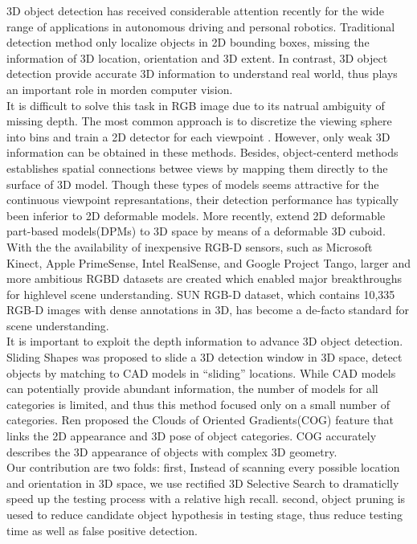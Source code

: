 \documentclass[english]{ccdconf}
\begin{document}
3D object detection has received considerable attention recently for the wide range of applications in autonomous driving and personal robotics\cite{xiang2014beyond}. Traditional detection method only localize objects in 2D bounding boxes, missing the information of 3D location, orientation and 3D extent. In contrast, 3D object detection provide accurate 3D information to understand real world, thus plays an important role in morden computer vision.\\
It is difficult to solve this task in RGB image due to its natrual ambiguity of missing depth. The most common approach is to discretize the viewing sphere into bins and train a 2D detector for each viewpoint \cite{gu2010discriminative}. However, only weak 3D information can be obtained in these methods. Besides, object-centerd methods establishes spatial connections betwee views by mapping them directly to the surface of 3D model. Though these types of models seems attractive for the continuous viewpoint represantations, their detection performance has typically been inferior to 2D deformable models. More recently, \cite{fidler20123d} extend 2D deformable part-based models(DPMs)\cite{felzenszwalb2010object} to 3D space by means of a deformable 3D cuboid.\\
With the the availability of inexpensive RGB-D sensors, such as Microsoft Kinect, Apple PrimeSense, Intel RealSense, and Google Project Tango, larger and more ambitious RGBD datasets are created which enabled major breakthroughs for highlevel scene understanding\cite{silberman2012indoor,janoch2013category}. SUN RGB-D dataset\cite{song2015sun}, which contains 10,335 RGB-D images with dense annotations in 3D, has become a de-facto standard for scene understanding.\\
It is important to exploit the depth information to advance 3D object detection. Sliding Shapes\cite{song2014sliding} was proposed to slide a 3D detection window in 3D space, detect objects by matching to CAD models in “sliding” locations. While CAD models can potentially provide abundant information, the number of models for all categories is limited, and thus this method focused only on a small number of categories. Ren\cite{ren2016three} proposed the Clouds of Oriented Gradients(COG) feature that links the 2D appearance and 3D pose of object categories. COG accurately describes the 3D appearance of objects with complex 3D geometry.\\
Our contribution are two folds:
first, Instead of scanning every possible location and orientation in 3D space, we use rectified 3D Selective Search to dramaticlly speed up the testing process with a relative high recall. 
second, object pruning is uesed to reduce candidate object hypothesis in testing stage, thus reduce testing time as well as false positive detection.
\end{document}

